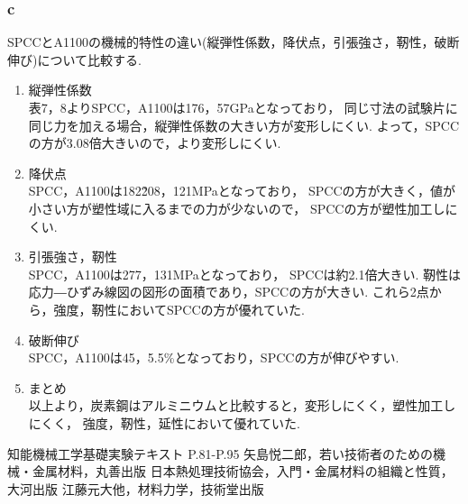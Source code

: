 \documentclass[10pt，a4j]{jsarticle}
\begin{document}
    \subsubsection{c}
      SPCCとA1100の機械的特性の違い(縦弾性係数，降伏点，引張強さ，靭性，破断伸び)について比較する.
      \begin{enumerate}
        \item 縦弾性係数 \\
          表7，8よりSPCC，A1100は176，57GPaとなっており，
          同じ寸法の試験片に同じ力を加える場合，縦弾性係数の大きい方が変形しにくい.
          よって，SPCCの方が3.08倍大きいので，より変形しにくい.
        \item 降伏点 \\
          SPCC，A1100は182\~208，121MPaとなっており，
          SPCCの方が大きく，値が小さい方が塑性域に入るまでの力が少ないので，
          SPCCの方が塑性加工しにくい.
        \item 引張強さ，靭性 \\
          SPCC，A1100は277，131MPaとなっており，
          SPCCは約2.1倍大きい.
          靭性は応力―ひずみ線図の図形の面積であり，SPCCの方が大きい.
          これら2点から，強度，靭性においてSPCCの方が優れていた.
        \item 破断伸び \\
          SPCC，A1100は45，5.5\%となっており，SPCCの方が伸びやすい.
        \item まとめ \\
          以上より，炭素鋼はアルミニウムと比較すると，変形しにくく，塑性加工しにくく，
          強度，靭性，延性において優れていた.
      \end{enumerate}
\begin{thebibliography}{3}
  \bibitem{}知能機械工学基礎実験テキスト P.81-P.95
  \bibitem{}矢島悦二郎，若い技術者のための機械・金属材料，丸善出版
  \bibitem{}日本熱処理技術協会，入門・金属材料の組織と性質，大河出版
  \bibitem{}江藤元大他，材料力学，技術堂出版
\end{thebibliography}
\end{document}
